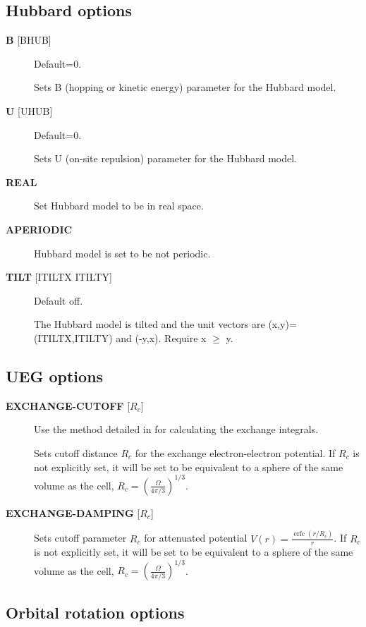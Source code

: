 \documentclass[openany,a4paper,10pt]{manual}
\begin{document}
\subsection{Hubbard options}
\begin{description}
\item[\textbf{B} {[}BHUB{]}]
Default=0.

Sets B (hopping or kinetic energy) parameter for the Hubbard model.

\item[\textbf{U} {[}UHUB{]}]
Default=0.

Sets U (on-site repulsion) parameter for the Hubbard model.

\item[\textbf{REAL}]
Set Hubbard model to be in real space.

\item[\textbf{APERIODIC}]
Hubbard model is set to be not periodic.

\item[\textbf{TILT} {[}ITILTX ITILTY{]}]
Default off.

The Hubbard model is tilted and the unit vectors are
(x,y)=(ITILTX,ITILTY) and (-y,x).  Require x $\ge$ y.

\end{description}


\subsection{UEG options}
\begin{description}
\item[\textbf{EXCHANGE-CUTOFF} {[}$R_c${]}]
Use the method detailed in \cite{AttenEx} for calculating the exchange
integrals.

Sets cutoff distance $R_c$ for the exchange electron-electron
potential.  If $R_c$ is not explicitly set, it will
be set to be equivalent to a sphere of the same volume as the cell,
$R_c=(\frac{\Omega}{4\pi/3})^{1/3}$.

\item[\textbf{EXCHANGE-DAMPING} {[}$R_c${]}]
Sets cutoff parameter $R_c$ for attenuated potential
$V(r)=\frac{\operatorname{erfc}(r/R_c)}{r}$.  If $R_c$ is not explicitly set,
it will be set to be equivalent to a sphere of the same volume as the cell,
$R_c=(\frac{\Omega}{4\pi/3})^{1/3}$.

\end{description}


\subsection{Orbital rotation options}
\end{document}
